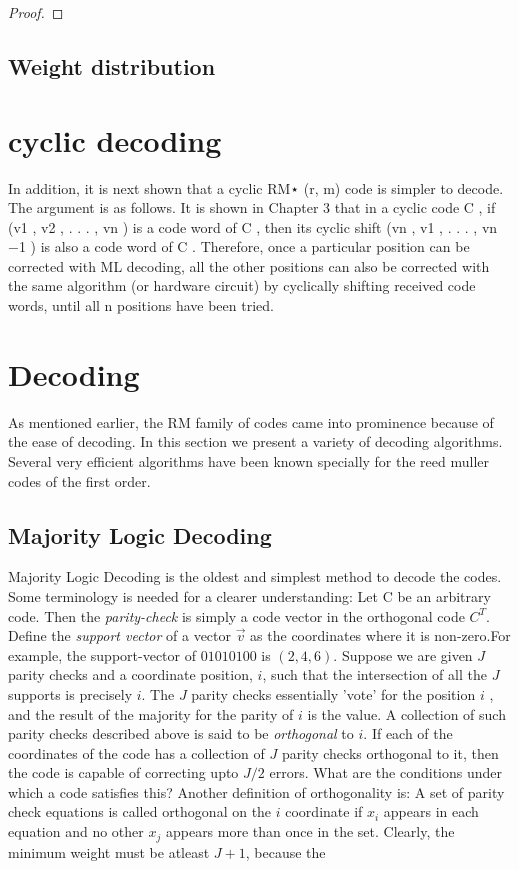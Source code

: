 \begin{thm}

\begin{proof}
\end{proof}
\end{thm}

\subsection {Weight distribution}

\section{cyclic decoding}
In addition, it is next shown that a cyclic RM⋆ (r, m) code is simpler to decode. The 
argument is as follows. It is shown in Chapter 3 that in a cyclic code C , if (v1 , v2 , . . . , vn ) 
is a code word of C , then its cyclic shift (vn , v1 , . . . , vn 
−1 ) is also a code word of C . 
Therefore, once a particular position can be corrected with ML decoding, all the other 
positions can also be corrected with the same algorithm (or hardware circuit) by cyclically 
shifting received code words, until all n positions have been tried.
\section {Decoding}
As mentioned earlier, the RM family of codes came into prominence because of the ease of decoding. In this section we present a variety of decoding algorithms. 
Several very efficient algorithms have been known specially for the reed muller codes of the first order. 
\subsection {Majority Logic Decoding}
Majority Logic Decoding is the oldest and simplest method to decode the \rem codes. 
Some terminology is needed for a clearer understanding:
Let C be an arbitrary code. Then the \emph{parity-check} is simply a code vector in the orthogonal code $C^{T}$. 
Define the \emph{support vector} of a vector $\vec{v}$ as the coordinates where it is non-zero.For example, the support-vector of $01010100$ is $(2,4,6)$.
Suppose we are given $J$ parity checks and a coordinate position, $i$, such that the intersection of all the $J$ supports is precisely $i$. The $J$ parity checks essentially 'vote' for the position $i$ , and the result of the majority for the parity of $i$ is the value. 
A collection of such parity checks described above is said to be \emph{orthogonal} to $i$. If each of the coordinates of the code has a collection of $J$ parity checks orthogonal to it, then the code is capable of correcting upto $J/2$  errors.
What are the conditions under which a code satisfies this?
Another definition of orthogonality is: A set of parity check equations is called orthogonal on the $i$ coordinate if $x_i$ appears in each equation and no other $x_j$ appears more than once in the set.
Clearly, the minimum weight must be atleast $J+1$, because the 

